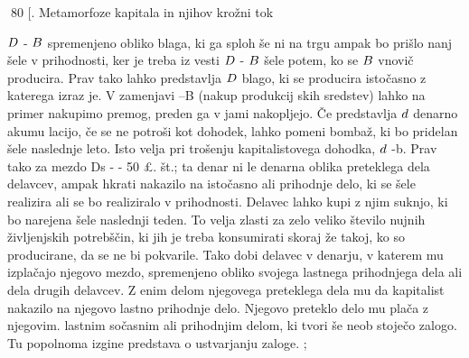 \documentclass[kapital_02.tex]{subfiles}
\begin{document}
80 [. Metamorfoze kapitala in njihov krožni tok

















































 \( D \) - \( B \) spremenjeno obliko blaga, ki ga sploh še ni na trgu ampak bo prišlo nanj šele v prihodnosti, ker je treba iz vesti \( D \) - \( B \) šele potem, ko se \( B \) vnovič producira. Prav tako lahko predstavlja \( D \) blago, ki se producira istočasno z katerega izraz je. V zamenjavi \KPED--B (nakup produkcij skih sredstev) lahko na primer nakupimo premog, preden ga v jami nakopljejo. Če predstavlja \( d \) denarno akumu lacijo, če se ne potroši kot dohodek, lahko pomeni bombaž, ki bo pridelan šele naslednje leto. Isto velja pri trošenju kapitalistovega dohodka, \( d \) -b. Prav tako za mezdo Ds - - 50 £. št.; ta denar ni le denarna oblika preteklega dela delavcev, ampak hkrati nakazilo na istočasno ali prihodnje delo, ki se šele realizira ali se bo realiziralo v prihodnosti. Delavec lahko kupi z njim suknjo, ki bo narejena šele naslednji teden. To velja zlasti za zelo veliko število nujnih življenjskih potrebščin, ki jih je treba konsumirati skoraj že takoj, ko so producirane, da se ne bi pokvarile. Tako dobi delavec v denarju, v katerem mu izplačajo njegovo mezdo, spremenjeno obliko svojega lastnega prihodnjega dela ali dela drugih delavcev. Z enim delom njegovega preteklega dela mu da kapitalist nakazilo na njegovo lastno prihodnje delo. Njegovo preteklo delo mu plača z njegovim. lastnim sočasnim ali prihodnjim delom, ki tvori še neob stoječo zalogo. Tu popolnoma izgine predstava o ustvarjanju zaloge. ;
\end{document}
